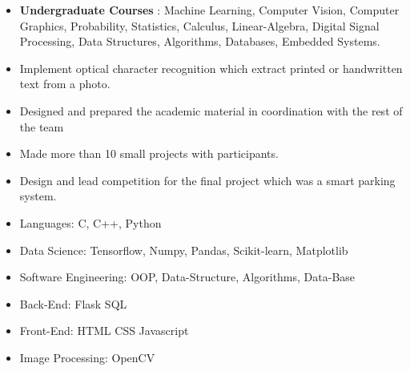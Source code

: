 \documentclass[10pt,a4paper,ragged2e]{altacv}
\begin{document}

\begin{fullwidth}
\makecvheader
\end{fullwidth}



\begin{itemize}
\item   \textbf {Undergraduate Courses} : Machine Learning, Computer Vision, Computer Graphics, Probability, Statistics, Calculus, Linear-Algebra, Digital Signal Processing, Data Structures, Algorithms, Databases, Embedded Systems.
  
\end{itemize}


\begin{itemize}
\item Implement optical character recognition which extract printed or handwritten text from a photo.  
\end{itemize}

\begin{itemize}
\item Designed and prepared the academic material in coordination with the rest of the team
\smallskip
\item Made more than 10 small projects with participants.
\smallskip
\item Design and lead competition for the final project which was a smart parking system.
\end{itemize}



\begin{itemize}
\item Languages: C, C++, Python
\smallskip
\item Data Science: Tensorflow, Numpy, Pandas, Scikit-learn, Matplotlib
\smallskip
\item Software Engineering: OOP, Data-Structure, Algorithms, Data-Base
\smallskip
\item Back-End: Flask SQL
\smallskip
\item Front-End: HTML CSS Javascript
\smallskip
\item Image Processing: OpenCV
\end{itemize}
\end{document}
